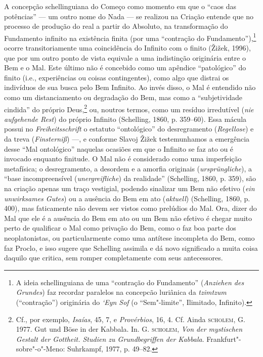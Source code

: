 A concepção schellinguiana do Começo como momento em que o “caos
das potências” --- um outro nome do Nada --- se realizou na Criação
entende que no processo de produção do real a partir do
Absoluto, na transformação do Fundamento infinito na existência
finita (por uma “contração do Fundamento”),\footnote{ A ideia
schellinguiana de uma “contração do Fundamento”
(\emph{Anziehen des Grundes}) faz recordar paralelos na
concepcão luriânica da \emph{tzimtzum} (“contração”)
originária do \emph{‘Eyn Sof} (o “Sem"-limite”, Ilimitado,
Infinito).} ocorre transitoriamente uma coincidência do
Infinito com o finito (Žižek, 1996), que por
um outro ponto de vista equivale a uma indistinção originária
entre o Bem e o Mal.  Este último não é concebido como um
apêndice “patológico” do finito (i.e., experiências ou
coisas contingentes), como algo que distrai os indivíduos de sua
busca pelo Bem Infinito. Ao invés disso, o Mal é entendido não
como um distanciamento ou degradação do Bem, mas como a
“subjetividade cindida” do próprio Deus,\footnote{ Cf., por
exemplo, \emph{Isaías}, 45, 7, e \emph{Provérbios}, 16, 4.
Cf. Ainda \textsc{scholem}, G. 1977. Gut und Böse in der Kabbala. In. G.
\textsc{scholem}, \textit{Von der mystischen Gestalt der Gottheit.
Studien zu Grundbegriffen der Kabbala}. Frankfurt"-sobre"-o"-Meno:
Suhrkampf, 1977, p. 49--82.} ou, noutros termos, como um resíduo
irredutível (\emph{nie aufgehende Rest}) do próprio Infinito
(Schelling, 1860, p. 359--60). Essa mácula possui no
\emph{Freiheitsschrift} o estatuto “ontológico” do
desregramento (\emph{Regellose}) e da treva
(\emph{Finsterniß}) ---, e conforme Slavoj Žižek testemunhamos a
emergência desse “Mal ontológico” naquelas ocasiões em que o
Infinito se faz ato ou é invocado enquanto finitude. O Mal não é
considerado como uma imperfeição metafísica; o desregramento, a
desordem e a amorfia originais (\emph{ursprüngliche}), a “base
incompreensível (\emph{unergreifliche}) da realidade”
(Schelling, 1860, p. 359), são na criação apenas um traço
vestigial, podendo sinalizar um Bem não efetivo (\emph{ein
unwirksames Gutes}) ou a ausência do Bem em ato
(\emph{aktuell}) (Schelling, 1860, p. 400), mas faticamente
não devem ser vistos como prelúdios do Mal. Ora, dizer do Mal
que ele é a ausência do Bem em ato ou um Bem não efetivo é
chegar muito perto de qualificar o Mal como privação do Bem,
como o faz boa parte dos neoplatonistas, ou particularmente como
uma antítese incompleta do Bem, como faz Proclo, e isso sugere
que Schelling assimila e dá novo significado a muita coisa
daquilo que critica, sem romper completamente com seus
antecessores.

